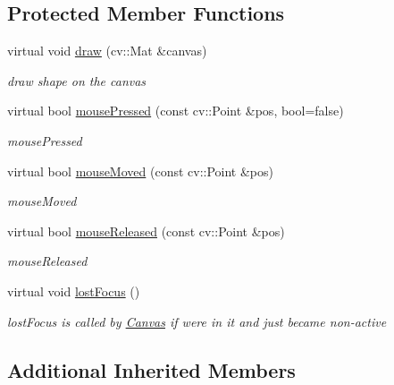 \subsection*{Protected Member Functions}
\begin{DoxyCompactItemize}
\item 
virtual void \hyperlink{classcanvascv_1_1Handle_aa1222a3978874c0a9534c2a86ef8b51f}{draw} (cv\+::\+Mat \&canvas)
\begin{DoxyCompactList}\small\item\em draw shape on the canvas \end{DoxyCompactList}\item 
virtual bool \hyperlink{classcanvascv_1_1Handle_ab6b57f86c6c8ae1385b495b9f790c742}{mouse\+Pressed} (const cv\+::\+Point \&pos, bool=false)
\begin{DoxyCompactList}\small\item\em mouse\+Pressed \end{DoxyCompactList}\item 
virtual bool \hyperlink{classcanvascv_1_1Handle_a68dee628b020ae4360e90c58b51d5291}{mouse\+Moved} (const cv\+::\+Point \&pos)
\begin{DoxyCompactList}\small\item\em mouse\+Moved \end{DoxyCompactList}\item 
virtual bool \hyperlink{classcanvascv_1_1Handle_a9d6a7db28837396d45b90db7bce79b76}{mouse\+Released} (const cv\+::\+Point \&pos)
\begin{DoxyCompactList}\small\item\em mouse\+Released \end{DoxyCompactList}\item 
virtual void \hyperlink{classcanvascv_1_1Handle_a8f689a060f2f1c6f9c465667dc54dc8f}{lost\+Focus} ()\hypertarget{classcanvascv_1_1Handle_a8f689a060f2f1c6f9c465667dc54dc8f}{}\label{classcanvascv_1_1Handle_a8f689a060f2f1c6f9c465667dc54dc8f}

\begin{DoxyCompactList}\small\item\em lost\+Focus is called by \hyperlink{classcanvascv_1_1Canvas}{Canvas} if we\textquotesingle{}re in it and just became non-\/active \end{DoxyCompactList}\end{DoxyCompactItemize}
\subsection*{Additional Inherited Members}


